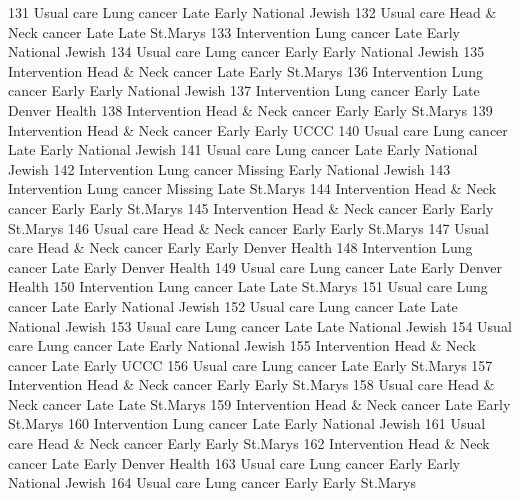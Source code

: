 \documentclass[
  letterpaper,
  DIV=11,
  numbers=noendperiod]{scrreprt}
\newenvironment{Shaded}{\begin{snugshade}}{\end{snugshade}}
\newcommand{\NormalTok}[1]{\textcolor[rgb]{0.00,0.23,0.31}{#1}}
\begin{document}
\begin{Shaded}
\begin{Highlighting}[]
\NormalTok{131   Usual care        Lung cancer    Late Early National Jewish}
\NormalTok{132   Usual care Head \& Neck cancer    Late  Late        St.Marys}
\NormalTok{133 Intervention        Lung cancer    Late Early National Jewish}
\NormalTok{134   Usual care        Lung cancer   Early Early National Jewish}
\NormalTok{135 Intervention Head \& Neck cancer    Late Early        St.Marys}
\NormalTok{136 Intervention        Lung cancer   Early Early National Jewish}
\NormalTok{137 Intervention        Lung cancer   Early  Late   Denver Health}
\NormalTok{138 Intervention Head \& Neck cancer   Early Early        St.Marys}
\NormalTok{139 Intervention Head \& Neck cancer   Early Early            UCCC}
\NormalTok{140   Usual care        Lung cancer    Late Early National Jewish}
\NormalTok{141   Usual care        Lung cancer    Late Early National Jewish}
\NormalTok{142 Intervention        Lung cancer Missing Early National Jewish}
\NormalTok{143 Intervention        Lung cancer Missing  Late        St.Marys}
\NormalTok{144 Intervention Head \& Neck cancer   Early Early        St.Marys}
\NormalTok{145 Intervention Head \& Neck cancer   Early Early        St.Marys}
\NormalTok{146   Usual care Head \& Neck cancer   Early Early        St.Marys}
\NormalTok{147   Usual care Head \& Neck cancer   Early Early   Denver Health}
\NormalTok{148 Intervention        Lung cancer    Late Early   Denver Health}
\NormalTok{149   Usual care        Lung cancer    Late Early   Denver Health}
\NormalTok{150 Intervention        Lung cancer    Late  Late        St.Marys}
\NormalTok{151   Usual care        Lung cancer    Late Early National Jewish}
\NormalTok{152   Usual care        Lung cancer    Late  Late National Jewish}
\NormalTok{153   Usual care        Lung cancer    Late  Late National Jewish}
\NormalTok{154   Usual care        Lung cancer    Late Early National Jewish}
\NormalTok{155 Intervention Head \& Neck cancer    Late Early            UCCC}
\NormalTok{156   Usual care        Lung cancer    Late Early        St.Marys}
\NormalTok{157 Intervention Head \& Neck cancer   Early Early        St.Marys}
\NormalTok{158   Usual care Head \& Neck cancer    Late  Late        St.Marys}
\NormalTok{159 Intervention Head \& Neck cancer    Late Early        St.Marys}
\NormalTok{160 Intervention        Lung cancer    Late Early National Jewish}
\NormalTok{161   Usual care Head \& Neck cancer   Early Early        St.Marys}
\NormalTok{162 Intervention Head \& Neck cancer    Late Early   Denver Health}
\NormalTok{163   Usual care        Lung cancer   Early Early National Jewish}
\NormalTok{164   Usual care        Lung cancer   Early Early        St.Marys}

\end{Highlighting}
\end{Shaded}
\end{document}
